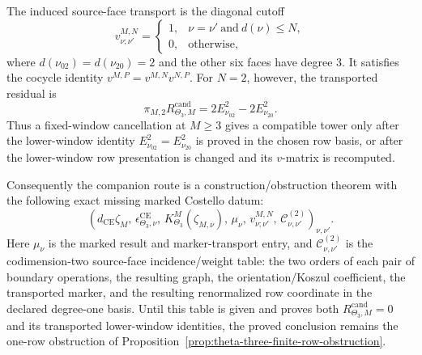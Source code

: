 \begin{thm}
  The induced source-face transport is the diagonal cutoff
  \[
    v^{M,N}_{\nu;\nu'}
      =
    \begin{cases}
      1,&\nu=\nu'\ \text{and}\ d(\nu)\leq N,\\
      0,&\text{otherwise},
    \end{cases}
  \]
  where \(d(\nu_{02})=d(\nu_{20})=2\) and the other six faces have
  degree \(3\).  It satisfies the cocycle identity
  \(v^{M,P}=v^{M,N}v^{N,P}\).  For \(N=2\), however, the transported
  residual is
  \[
    \pi_{M,2}R^{\mathrm{cand}}_{\Theta_3,M}
      =
    2E^2_{\nu_{02}}-2E^2_{\nu_{20}}.
  \]
  Thus a fixed-window cancellation at \(M\geq3\) gives a compatible tower
  only after the lower-window identity
  \(E^2_{\nu_{02}}=E^2_{\nu_{20}}\) is proved in the chosen row basis, or
  after the lower-window row presentation is changed and its \(v\)-matrix is
  recomputed.

  Consequently the companion route is a construction/obstruction theorem
  with the following exact missing marked Costello datum:
  \[
    \left(
      d_{\mathrm{CE}}\zeta_M,\,
      \epsilon^{\mathrm{CE}}_{\Theta_3,\nu},\,
      K^M_{\Theta_3}(\zeta_{M,\nu}),\,
      \mu_\nu,\,
      v^{M,N}_{\nu;\nu'},\,
      \mathcal C^{(2)}_{\nu,\nu'}
    \right)_{\nu,\nu'} .
  \]
  Here \(\mu_\nu\) is the marked result and marker-transport entry, and
  \(\mathcal C^{(2)}_{\nu,\nu'}\) is the codimension-two source-face
  incidence/weight table: the two orders of each pair of boundary
  operations, the resulting graph, the orientation/Koszul coefficient, the
  transported marker, and the resulting renormalized row coordinate in the
  declared degree-one basis.  Until this table is given and proves both
  \(R^{\mathrm{cand}}_{\Theta_3,M}=0\) and its transported lower-window
  identities, the proved conclusion remains the one-row obstruction
  of Proposition~\ref{prop:theta-three-finite-row-obstruction}.
\end{thm}

